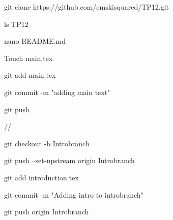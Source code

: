 git clone https://github.com/emskisquared/TP12.git

ls TP12

nano README.md

Touch main.tex

git add main.tex

git commit -m "adding main text"

git push

//

git checkout -b Introbranch

git push --set-upstream origin Introbranch

git add introduction.tex

git commit -m "Adding intro to introbranch"

git push origin Introbranch